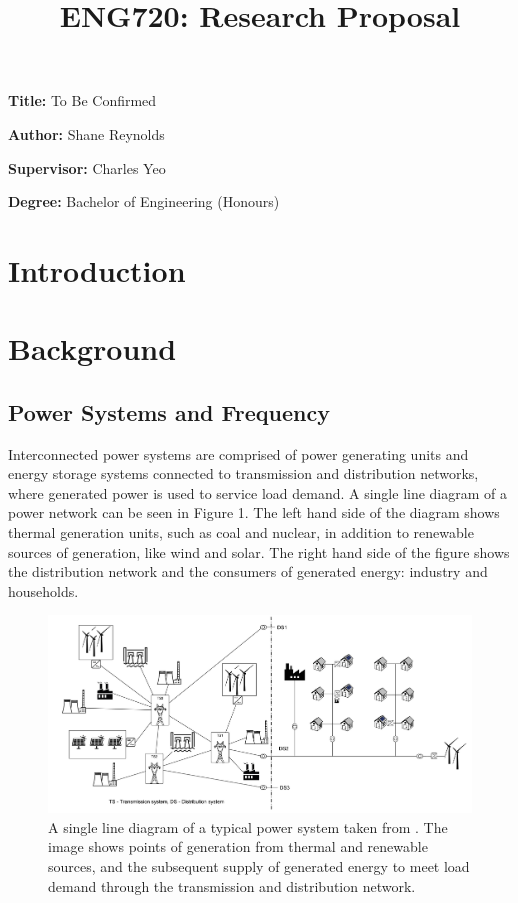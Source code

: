 \documentclass[12pt, a4paper]{article}
\title{ENG720: Research Proposal}
\author{}
\date{}
\newcommand{\namelistlabel}[1]{\mbox{#1}\hfil}
\newenvironment{namelist}[1]{%
\begin{list}{}
    {
        \let\makelabel\namelistlabel
        \settowidth{\labelwidth}{#1}
        \setlength{\leftmargin}{1.1\labelwidth}
    }
  }{%
\end{list}}
\begin{document}
\maketitle

\begin{namelist}{xxxxxxxxxxxx}
\item[{\bf Title:}]
	To Be Confirmed
\item[{\bf Author:}]
	Shane Reynolds
\item[{\bf Supervisor:}]
	Charles Yeo
\item[{\bf Degree:}]
	Bachelor of Engineering (Honours)
\end{namelist}


\tableofcontents
\newpage

\section{Introduction}

\section{Background}

\subsection{Power Systems and Frequency}
Interconnected power systems are comprised of power generating units and energy storage systems connected to transmission and distribution networks, where generated power is used to service load demand. A single line diagram of a power network can be seen in Figure 1. The left hand side of the diagram shows thermal generation units, such as coal and nuclear, in addition to renewable sources of generation, like wind and solar. The right hand side of the figure shows the distribution network and the consumers of generated energy: industry and households.
\begin{figure}[h]
	\centering
	\includegraphics[scale=0.85]{power_system}
	\caption{A single line diagram of a typical power system taken from \cite{Glavic2019}. The image shows points of generation from thermal and renewable sources, and the subsequent supply of generated energy to meet load demand through the transmission and distribution network.}
\end{figure}
\end{document}
